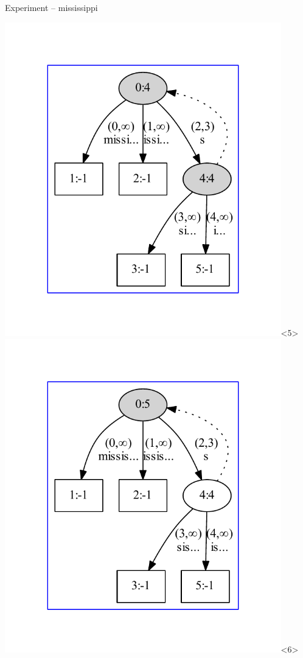 \begin{frame}{Experiment -- mississippi}
\begin{overlayarea}{\textwidth}{\textheight}
\includegraphics[keepaspectratio,height=0.9\textheight,width=0.9\textwidth]{missi.pdf}<5>
\includegraphics[keepaspectratio,height=0.9\textheight,width=0.9\textwidth]{missis.pdf}<6>

\end{overlayarea}
\end{frame}
